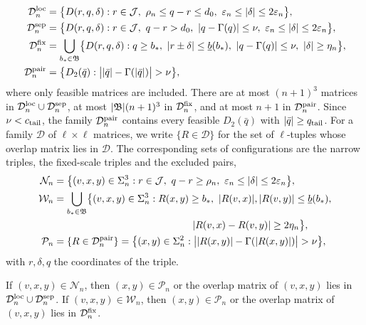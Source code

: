 \begin{align*}
 \mathcal D^{\rm loc}_n&=\bigl\{D(r,q,\delta):r\in\mathcal J,\ \rho_n\le q-r\le d_0,\ \varepsilon_n\le\abs\delta\le2\varepsilon_n\bigr\},\\
 \mathcal D^{\rm sep}_n&=\bigl\{D(r,q,\delta):r\in\mathcal J,\ q-r>d_0,\ \abs{q-\Gamma(q)}\le\nu,\ \varepsilon_n\le\abs\delta\le2\varepsilon_n\bigr\},\\
 \mathcal D^{\rm fix}_n&=\bigcup_{b_*\in\mathfrak B}\bigl\{D(r,q,\delta):q\ge b_*,\ \abs{r\pm\delta}\le\underline b(b_*),\ \abs{q-\Gamma(q)}\le\nu,\ \abs\delta\ge\eta_n\bigr\},\\
 \mathcal D^{\rm pair}_n&=\bigl\{D_2(\bar q):\bigl|\abs{\bar q}-\Gamma(\abs{\bar q})\bigr|>\nu\bigr\},
\end{align*}
where only feasible matrices are included. There are at most $(n+1)^3$ matrices in $\mathcal D^{\rm loc}_n\cup\mathcal D^{\rm sep}_n$, at most $\lvert \mathfrak B\rvert(n+1)^3$ in $\mathcal D^{\rm fix}_n$, and at most $n+1$ in $\mathcal D^{\rm pair}_n$. Since $\nu<c_{\rm tail}$, the family $\mathcal D^{\rm pair}_n$ contains every feasible $D_2(\bar q)$ with $\lvert \bar q\rvert\ge q_{\rm tail}$. For a family $\mathcal D$ of $\ell\times\ell$ matrices, we write $\{R\in\mathcal D\}$ for the set of $\ell$-tuples whose overlap matrix lies in $\mathcal D$. The corresponding sets of configurations are the narrow triples, the fixed-scale triples and the excluded pairs,
\begin{align*}
 \mathcal N_n&=\bigl\{(v,x,y)\in\Sigma_n^3:r\in\mathcal J,\ q-r\ge\rho_n,\ \varepsilon_n\le\abs\delta\le2\varepsilon_n\bigr\},\\
 \mathcal W_n&=\bigcup_{b_*\in\mathfrak B}\bigl\{(v,x,y)\in\Sigma_n^3:R(x,y)\ge b_*,\ \abs{R(v,x)},\abs{R(v,y)}\le\underline b(b_*),\\
 &\hspace{14em}\abs{R(v,x)-R(v,y)}\ge2\eta_n\bigr\},\\
 \mathcal P_n&=\{R\in\mathcal D^{\rm pair}_n\}=\bigl\{(x,y)\in\Sigma_n^2:\bigl|\abs{R(x,y)}-\Gamma(\abs{R(x,y)})\bigr|>\nu\bigr\},
\end{align*}
with $r,\delta,q$ the coordinates of the triple.

\begin{lemma}[Covering]\label{lem:st-cover}
If $(v,x,y)\in\mathcal N_n$, then $(x,y)\in\mathcal P_n$ or the overlap matrix of $(v,x,y)$ lies in $\mathcal D^{\rm loc}_n\cup\mathcal D^{\rm sep}_n$. If $(v,x,y)\in\mathcal W_n$, then $(x,y)\in\mathcal P_n$ or the overlap matrix of $(v,x,y)$ lies in $\mathcal D^{\rm fix}_n$.
\end{lemma}

